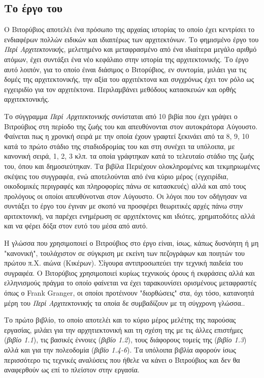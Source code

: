 \subsection{Το έργο του} 

Ο Βιτορύβιος αποτελέι ένα πρόσωπο της αρχαίας ιστορίας το οποίο έχει κεντρίσει το ενδιαφέρων πολλών ειδικών και ιδιαιτέρως των αρχιτεκτόνων. Το φημισμένο έργο του \emph{Περί Αρχιτεκτονικής}, μελετημένο και μεταφρασμένο από ένα ιδιαίτερα μεγάλο αριθμό ατόμων, έχει συντάξει ένα νέο κεφάλαιο στην ιστορία της αρχιτεκτονικής. Το έργο αυτό λοιπόν, για το οποίο έιναι διάσιμος ο Βιτορύβιος, εν συντομία, μιλάει για τις δομές της αρχιτεκτονικής,  την αξία του αρχιτέκτονα και συγχρόνως έχει τον ρόλο ως εγχειριδίο για τον αρχιτέκτονα. Περιλαμβάνει μεθόδους κατασκευών και ορθής αρχιτεκτονικής. \cite[σ. 16-18]{vitruvius-lefas}

Το σύγγραμμα \emph{Περί Αρχιτεκτονικής} συνίσταται από 10 βιβία που έχει γράψει ο Βιτρούβιος στη περίοδο της ζωής του και απευθύνονται στον αυτοκράτορα Αύγουστο. Φαίνεται πως η χρονική σειρά με την οποία έχουν γραφτεί ξεκινάει από τα 8, 9, 10 κατά το πρώτο στάδιο της σταδιοδρομίας του και στη συνέχει τα υπόλοιπα, με κανονική σειρά, 1, 2, 3 κλπ. τα οποία γράφτηκαν κατά το τελευταίο στάδιο της ζωής του, όπου και δημοσιεύτηκαν. Τα βιβίλα Περιέχουν ολοκληρομένες και τεκμηριωμένες σκέψεις του συγγραφέα, ενώ αποτελούνται από ένα κύριο μέρος (εγχειρίδια, οικοδομικές περιγραφές και πληροφορίες πάνω σε κατασκευές) αλλά και από τους προλόγους οι οποίοι απευθύνοτναι στον Αύγουστο. Οι λόγοι που τον οδήγησαν να συντάξει το έργο του έγιναν με σκοπό να προσφέρει θεωριτικές αρχές πάνω στην αριτεκτονική, να παρέχει ενημέρωση σε αρχιτέκτονες και ιδιότες, χρηματοδότες αλλά και να φέρει δόξα στον ευτό του μέσα από αυτό. \cite[σ. 14-16]{vitruvius-lefas}

Η γλώσσα που χρησιμοποιεί ο Βιτρούβιος στο έργο είναι, ίσως, κάπως δυσνόητη ή μη "κανονική", τουλάχιστον σε σύγκριση με εκείνη των πεζογράφων και ποιητών του πρώτου π.Χ. αιώνα (Κικέρων). Σίγουρα αντιπροσωπεύει την τεχνική παιδεία του συγραφέα. Ο Βιτορύβιος χρησιμοποιεί κυρίως τεχνικούς όρους ή εκφράσεις αλλά και ελληνισμούς πράγμα το οποίο φαίνεται να έχει ταρακουνίσει ορισμένους μεταφραστές όπως ο  Frank Granger, οι οποίοι προτέινουν "διορθώσεις" στα, όχι τόσο, κατανοητά μέρη του \emph{Περί Αρχιτεκτονικής} τα οποία δε συμβαδίζουν με τη σύγχρονη γλώσσα.. \cite[σ. 18-19 και 2 αντ.]{vitruvius-lefas,scranton_vitruvius_1974}

Το πρώτο βιβλίο, το οποίο αποτελέι και το κύριο μέρος μελέτης της παρούσας εργασίας, μιλάει για την αρχητιεκτονική και τη σχέση της με τις άλλες επιστήμες (\emph{βιβίο 1.1}), τις βασικές έννοιες (\emph{βιβίο 1.2}), τους διάφορους τομείς της (\emph{βιβίο 1.3}) αλλά και για την πολεοδομία (\emph{βιβίο 1.4-6}). Τα υπόλοιπα βιβλία αφορούν ίσως περισσότερο τις τεχνικές αναλύσεις που ήθελε να κάνει ο Βιτρούβιος και δεν θα αναφερθούν ως επί το πλείστον στην εργασία. \cite[σ, 16-18, 6 και 2 αντ.]{vitruvius-lefas,masterson_status_2004,scranton_vitruvius_1974}



